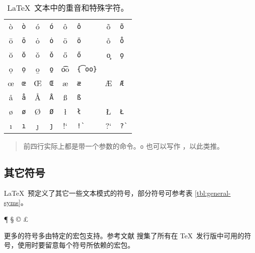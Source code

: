 \def\TSYM #1{#1       & \texttt{\string#1}}
\def\TACC #1#2{#1{#2} & \texttt{\string#1#2}}       %
\def\TTACC #1#2{#1{#2} & \texttt{\string#1 #2}}     %
\def\WTACC #1#2{#1{#2} & \texttt{\string#1\{#2\}}}  %
\begin{table}[htp]
\centering
\caption{\LaTeX\ 文本中的重音和特殊字符。} \label{tbl:accents}
\begin{tabular}{*4{cl}}
 \hline
 \TACC{\`}{o} & \TACC{\'}{o} & \TACC{\^}{o} & \TACC{\~}{o} \\
 \TACC{\=}{o} & \TACC{\.}{o} & \TACC{\"}{o} & \TTACC{\r}{o}\\
 \TTACC{\u}{o} & \TTACC{\v}{o} & \TTACC{\H}{o} & \TTACC{\c}{o} \\
 \TTACC{\d}{o} & \TTACC{\b}{o} & \WTACC{\t}{oo} \\[6pt]
 \TSYM{\oe} & \TSYM{\OE} & \TSYM{\ae} & \TSYM{\AE} \\
 \TSYM{\aa} & \TSYM{\AA} & \TSYM{\ss} \\[6pt]
 \TSYM{\o}  & \TSYM{\O}  & \TSYM{\l} & \TSYM{\L} \\
 \TSYM{\i}  & \TSYM{\j}  & !` & \verb|!`| & ?` & \verb|?`| \\
 \hline
\end{tabular}
\begin{quote}\footnotesize%
前四行实际上都是带一个参数的命令。\cmd{\textasciicircum}\texttt{o} 也可以写作
\cmd{\textasciicircum}，以此类推。
\end{quote}
\end{table}

\subsection{其它符号}\label{subsec:text-misc}

\LaTeX\ 预定义了其它一些文本模式的符号，部分符号可参考表 \ref{tbl:general-syms}。
\begin{example}
\P{} \S{} \dag{} \ddag{}
\copyright{} \pounds{}

\textasteriskcentered
\textperiodcentered
\textbullet

\textregistered{} \texttrademark
\end{example}

更多的符号多由特定的宏包支持。参考文献 \cite{symbols} 搜集了所有在 \TeX\ 发行版中可用的符号，使用时要留意每个符号所依赖的宏包。

